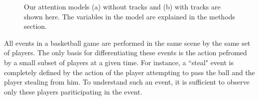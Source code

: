 \documentclass[10pt,twocolumn,letterpaper]{article}
\begin{document}
\begin{figure}[t!]
\begin{center}

\end{center}
   \caption{Our attention models (a) without tracks and (b) with tracks are
   shown here. The variables in the model are explained in the methods
 section.}
\label{fig:att_heatmap}
\end{figure}


All events in a basketball game are performed in the same scene by the same set
of players. The only basis for differentiating these events is the action
pefromed by a small subset of players at a given time.  For instance, a
``steal" event is completely defined by the action of the player attempting to
pass the ball and the player stealing from him.  To understand such an event,
it is sufficient to observe only these players pariticipating in the event.
\end{document}

